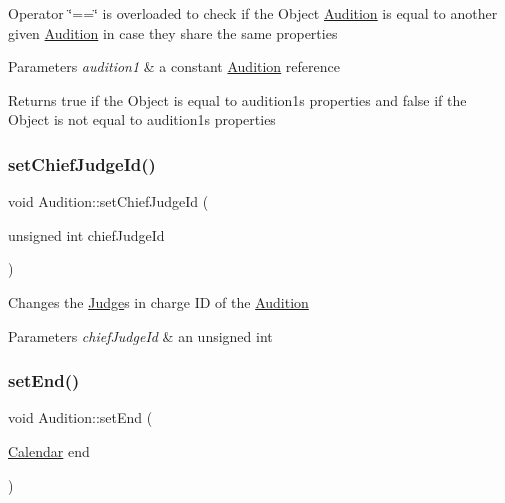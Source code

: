 Operator \char`\"{}==\char`\"{} is overloaded to check if the Object \hyperlink{class_audition}{Audition} is equal to another given \hyperlink{class_audition}{Audition} in case they share the same properties 
\begin{DoxyParams}{Parameters}
{\em audition1} & a constant \hyperlink{class_audition}{Audition} reference \\
\hline
\end{DoxyParams}
\begin{DoxyReturn}{Returns}
true if the Object is equal to audition1\textquotesingle{}s properties and false if the Object is not equal to audition1\textquotesingle{}s properties 
\end{DoxyReturn}
\mbox{\label{class_audition_a9a6e504bfa0ac383a13404a3a6544935}} 
\subsubsection{\texorpdfstring{set\+Chief\+Judge\+Id()}{setChiefJudgeId()}}
{\footnotesize\ttfamily void Audition\+::set\+Chief\+Judge\+Id (\begin{DoxyParamCaption}\item[{unsigned int}]{chief\+Judge\+Id }\end{DoxyParamCaption})}

Changes the \hyperlink{class_judge}{Judge}\textquotesingle{}s in charge ID of the \hyperlink{class_audition}{Audition} 
\begin{DoxyParams}{Parameters}
{\em chief\+Judge\+Id} & an unsigned int \\
\hline
\end{DoxyParams}
\mbox{\label{class_audition_add002a59ed08c058cee6635fa910380f}} 
\subsubsection{\texorpdfstring{set\+End()}{setEnd()}}
{\footnotesize\ttfamily void Audition\+::set\+End (\begin{DoxyParamCaption}\item[{\hyperlink{class_calendar}{Calendar}}]{end }\end{DoxyParamCaption})}

